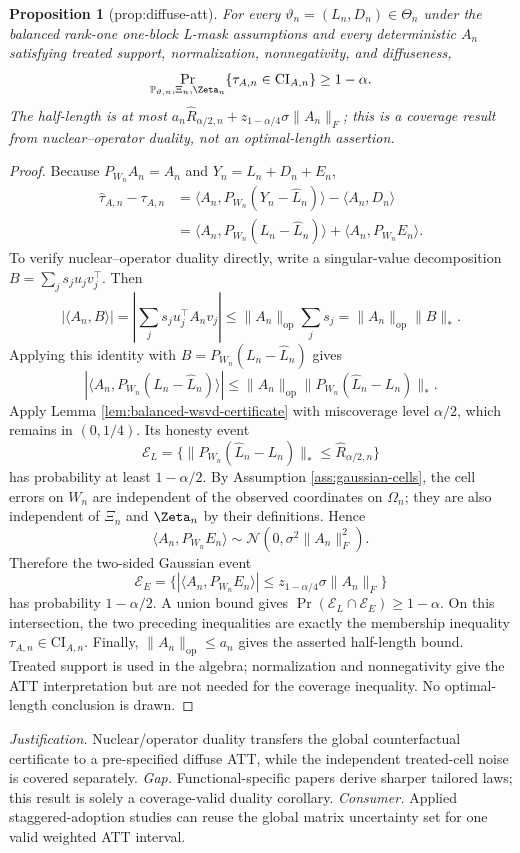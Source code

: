 \documentclass{article}
\newtheorem{proposition}{Proposition}
\begin{document}
\begin{proposition}[prop:diffuse-att]\label{prop:diffuse-att}
For every \(\vartheta_n=(L_n,D_n)\in\Theta_n\) under the balanced rank-one one-block L-mask assumptions and every deterministic \(A_n\) satisfying treated support, normalization, nonnegativity, and diffuseness, \[\Pr_{\mathbb P_{\vartheta,n},\Xi_n,\Zeta_n}\{\tau_{A,n}\in\mathrm{CI}_{A,n}\}\ge1-\alpha.\] The half-length is at most \(a_n\widehat R_{\alpha/2,n}+z_{1-\alpha/4}\sigma\lVert A_n\rVert_F\); this is a coverage result from nuclear--operator duality, not an optimal-length assertion.
\end{proposition}
\begin{proof}
Because \(P_{W_n}A_n=A_n\) and \(Y_n=L_n+D_n+E_n\),
\[
\begin{aligned}
\widehat\tau_{A,n}-\tau_{A,n}
&=\langle A_n,P_{W_n}(Y_n-\widehat L_n)\rangle
-\langle A_n,D_n\rangle\\
&=\langle A_n,P_{W_n}(L_n-\widehat L_n)\rangle
+\langle A_n,P_{W_n}E_n\rangle.
\end{aligned}
\]
To verify nuclear--operator duality directly, write a singular-value decomposition
\(B=\sum_js_ju_jv_j^{\top}\).  Then
\[
|\langle A_n,B\rangle|
=\left|\sum_js_ju_j^{\top}A_nv_j\right|
\le\lVert A_n\rVert_{\mathrm{op}}\sum_js_j
=\lVert A_n\rVert_{\mathrm{op}}\lVert B\rVert_*.
\]
Applying this identity with \(B=P_{W_n}(L_n-\widehat L_n)\) gives
\[
|\langle A_n,P_{W_n}(L_n-\widehat L_n)\rangle|
\le\lVert A_n\rVert_{\mathrm{op}}
\lVert P_{W_n}(\widehat L_n-L_n)\rVert_*.
\]
Apply Lemma \ref{lem:balanced-wsvd-certificate} with miscoverage level \(\alpha/2\), which remains in \((0,1/4)\).  Its honesty event
\[
\mathcal E_L=
\{\lVert P_{W_n}(\widehat L_n-L_n)\rVert_*
\le\widehat R_{\alpha/2,n}\}
\]
has probability at least \(1-\alpha/2\).  By Assumption \ref{ass:gaussian-cells}, the cell errors on \(W_n\) are independent of the observed coordinates on \(\Omega_n\); they are also independent of \(\Xi_n\) and \(\Zeta_n\) by their definitions.  Hence
\[
\langle A_n,P_{W_n}E_n\rangle
\sim\mathcal N(0,\sigma^2\lVert A_n\rVert_F^2).
\]
Therefore the two-sided Gaussian event
\[
\mathcal E_E=
\{|\langle A_n,P_{W_n}E_n\rangle|
\le z_{1-\alpha/4}\sigma\lVert A_n\rVert_F\}
\]
has probability \(1-\alpha/2\).  A union bound gives
\(\Pr(\mathcal E_L\cap\mathcal E_E)\ge1-\alpha\).  On this intersection, the two preceding inequalities are exactly the membership inequality
\(\tau_{A,n}\in\mathrm{CI}_{A,n}\).  Finally,
\(\lVert A_n\rVert_{\mathrm{op}}\le a_n\) gives the asserted half-length bound.  Treated support is used in the algebra; normalization and nonnegativity give the ATT interpretation but are not needed for the coverage inequality.  No optimal-length conclusion is drawn.
\end{proof}
\par\smallskip\noindent \textit{Justification.} Nuclear/operator duality transfers the global counterfactual certificate to a pre-specified diffuse ATT, while the independent treated-cell noise is covered separately. \textit{Gap.} Functional-specific papers derive sharper tailored laws; this result is solely a coverage-valid duality corollary. \textit{Consumer.} Applied staggered-adoption studies can reuse the global matrix uncertainty set for one valid weighted ATT interval.
\end{document}
